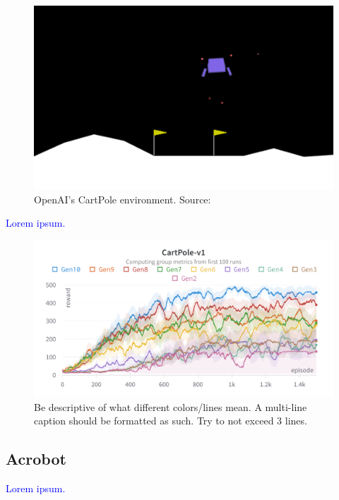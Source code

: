\documentclass{article}
\newcommand{\TODO}[1]{\textcolor{blue}{#1}}
\begin{document}
\begin{figure}[htbp]
    \centering
    \includegraphics[width=0.9\linewidth]{figs/lunarlander.png}
    \caption{
        OpenAI's CartPole environment. 
        Source: \cite{gymlibraryLunarLander}
    }
    \label{fig:cartpole}
\end{figure}

\TODO{Lorem ipsum.}

\begin{figure}[htbp]
    \centering
    \includegraphics[width=0.9\linewidth]{figs/lc-cp.png}
    \caption{
        Be descriptive of what different colors/lines mean.
        A multi-line caption should be formatted as such.
        Try to not exceed 3 lines.
    }
    \label{fig:lc-cp}
\end{figure}

\subsection{Acrobot}
\label{ssec:ab}

\TODO{Lorem ipsum.}

\end{document}
